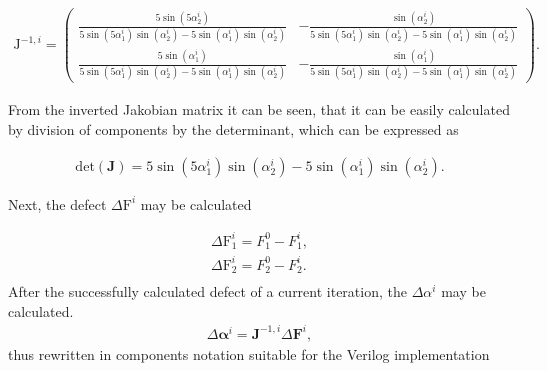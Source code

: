 \documentclass[a4paper, twoside, 11pt]{article}
\begin{document}
        \begin{equation}
            \begin{gathered}
                \mathrm{J}^{-1,i} = 
                \begin{pmatrix}
                \frac{5 \sin(5\alpha_2^i)}{5 \sin(5\alpha_1^i) \sin(\alpha_2^i) - 5 \sin(\alpha_1^i)\sin(\alpha_2^i)} & - \frac{\sin(\alpha_2^i)}{5 \sin(5\alpha_1^i) \sin(\alpha_2^i) - 5 \sin(\alpha_1^i)\sin(\alpha_2^i)}\\
                    \frac{5\sin(\alpha_1^i)}{5 \sin(5\alpha_1^i) \sin(\alpha_2^i) - 5 \sin(\alpha_1^i)\sin(\alpha_2^i)} & - \frac{\sin(\alpha_1^i)}{5 \sin(5\alpha_1^i) \sin(\alpha_2^i) - 5 \sin(\alpha_1^i)\sin(\alpha_2^i)}
                \end{pmatrix}.
            \end{gathered}
        \end{equation}

        From the inverted Jakobian matrix it can be seen, that it can be easily calculated by division of components by the determinant, which can be expressed as

        \begin{equation}
            \begin{gathered}
                \mathrm{det}(\textbf{J}) = 5 \sin(5\alpha_1^i) \sin(\alpha_2^i) - 5 \sin(\alpha_1^i)\sin(\alpha_2^i).
            \end{gathered}
        \end{equation}


        Next, the defect $\Delta \mathrm{F}^i$ may be calculated

        \begin{equation}
            \begin{gathered}
                \Delta \mathrm{F}_1^i = F_1^0 - F_1^i,\\
                \Delta \mathrm{F}_2^i = F_2^0 - F_2^i.\\
            \end{gathered}
        \end{equation}
        After the successfully calculated defect of a current iteration, the $\Delta \alpha^i$ may be calculated.
        \begin{equation}
            \begin{gathered}
                \Delta \boldsymbol{\alpha}^i = \textbf{J}^{-1,i} \Delta \boldsymbol{F}^i,
            \end{gathered}
        \end{equation}
        thus rewritten in components notation suitable for the Verilog implementation
\end{document}
